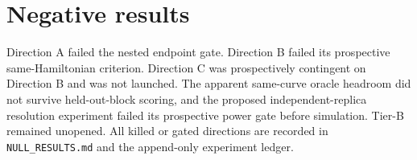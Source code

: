 \documentclass[11pt]{article}
\begin{document}
\section{Negative results}
Direction A failed the nested endpoint gate. Direction B failed its prospective same-Hamiltonian criterion. Direction C was prospectively contingent on Direction B and was not launched. The apparent same-curve oracle headroom did not survive held-out-block scoring, and the proposed independent-replica resolution experiment failed its prospective power gate before simulation. Tier-B remained unopened. All killed or gated directions are recorded in \texttt{NULL\_RESULTS.md} and the append-only experiment ledger.
\end{document}
